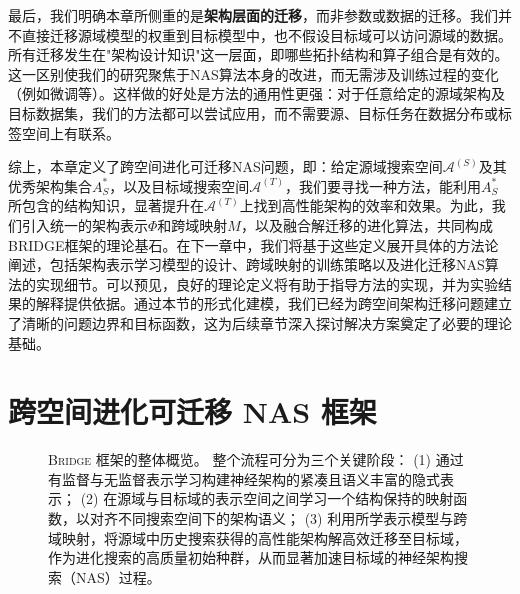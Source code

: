 \documentclass[../main.tex]{subfiles}
\begin{document}
最后，我们明确本章所侧重的是\textbf{架构层面的迁移}，而非参数或数据的迁移。我们并不直接迁移源域模型的权重到目标模型中，也不假设目标域可以访问源域的数据。所有迁移发生在"架构设计知识"这一层面，即哪些拓扑结构和算子组合是有效的。这一区别使我们的研究聚焦于NAS算法本身的改进，而无需涉及训练过程的变化（例如微调等）。这样做的好处是方法的通用性更强：对于任意给定的源域架构及目标数据集，我们的方法都可以尝试应用，而不需要源、目标任务在数据分布或标签空间上有联系。

综上，本章定义了跨空间进化可迁移NAS问题，即：给定源域搜索空间$\mathcal{A}^{(S)}$及其优秀架构集合$A^*_S$，以及目标域搜索空间$\mathcal{A}^{(T)}$，我们要寻找一种方法，能利用$A^*_S$所包含的结构知识，显著提升在$\mathcal{A}^{(T)}$上找到高性能架构的效率和效果。为此，我们引入统一的架构表示$\Phi$和跨域映射$M$，以及融合解迁移的进化算法，共同构成BRIDGE框架的理论基石。在下一章中，我们将基于这些定义展开具体的方法论阐述，包括架构表示学习模型的设计、跨域映射的训练策略以及进化迁移NAS算法的实现细节。可以预见，良好的理论定义将有助于指导方法的实现，并为实验结果的解释提供依据。通过本节的形式化建模，我们已经为跨空间架构迁移问题建立了清晰的问题边界和目标函数，这为后续章节深入探讨解决方案奠定了必要的理论基础。

\section[\hspace{-2pt}跨空间进化可迁移 NAS 框架]{\heiti{}\hspace{-8pt}跨空间进化可迁移 NAS 框架}

\begin{figure}[htbp]
	\centering
	\caption{
		\textsc{Bridge} 框架的整体概览。
		整个流程可分为三个关键阶段：
		(1) 通过有监督与无监督表示学习构建神经架构的紧凑且语义丰富的隐式表示；
		(2) 在源域与目标域的表示空间之间学习一个结构保持的映射函数，以对齐不同搜索空间下的架构语义；
		(3) 利用所学表示模型与跨域映射，将源域中历史搜索获得的高性能架构解高效迁移至目标域，作为进化搜索的高质量初始种群，从而显著加速目标域的神经架构搜索（NAS）过程。
	}\label{fig:overview}
\end{figure}
\end{document}

